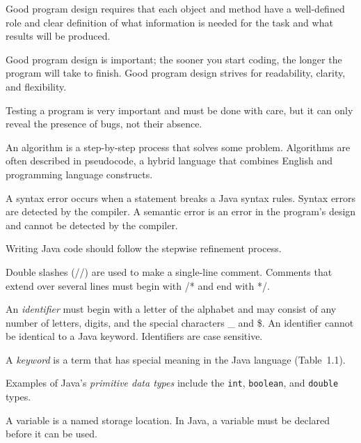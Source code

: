 \label{summaryof-important-points}
\begin{BL}

\item  Good program design requires that each object and method
have a well-defined role and clear definition of what information is needed
for the task and what results will be produced.

\item Good program design is important; the sooner you start coding, 
the longer the program will take to finish. Good program design
strives for readability, clarity, and flexibility.

\item  Testing a program is very important and must be done with
care, but it can only reveal the presence of bugs, not their absence.

\item  An algorithm is a step-by-step process that solves some
problem.  Algorithms are often described in pseudocode, a hybrid
language that combines English and programming language constructs.

\item  A syntax error occurs when a statement breaks a Java 
syntax rules.  Syntax errors are detected by the compiler.  A semantic
error is an error in the program's design and cannot be detected by
the compiler.

\item  Writing Java code should follow the stepwise refinement process.

\item Double slashes (//) are used to make a single-line comment.
Comments that extend over several lines must begin with /* and end
with */. 

\item  An {\it identifier} must begin with a letter of the
alphabet and may consist of any number of letters, digits, and the
special characters \_ and \$. An identifier cannot be identical to a
Java keyword. Identifiers are case sensitive.

\item  A {\it keyword} is a term that has special meaning in the
Java language (Table~1.1).

\item  Examples of Java's  {\it primitive data types} include
the {\tt int}, {\tt boolean}, and {\tt double} types. 

\item A variable is a named storage location. In Java, a 
variable must be declared before it can be used.


\end{BL}
